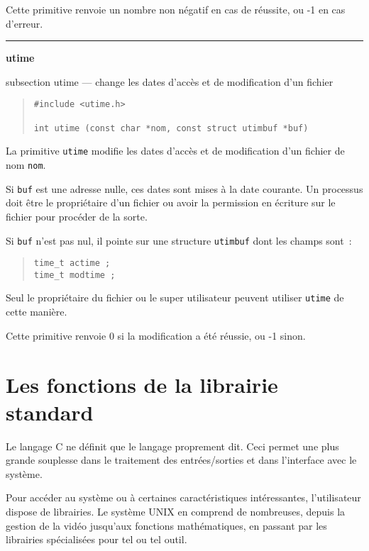 \documentclass [twoside] {report}
\newcommand {\primitive} [1]
    {
	\phantomsection
	{\large \bf #1}
	\addcontentsline {toc} {subsection} {#1}
    }
\newcommand {\separation}
    {
	\vspace {5mm}
	\nopagebreak
	\hrule
    }
\begin{document}
Cette primitive renvoie un nombre non négatif en
cas de réussite, ou -1 en cas d'erreur.




\separation
\primitive {utime} --- change les dates d'accès et de modification d'un fichier

\begin {quote}
\begin {verbatim}
#include <utime.h>

int utime (const char *nom, const struct utimbuf *buf)
\end{verbatim}
\end {quote}

La primitive {\tt utime} modifie les dates d'accès
et de modification d'un fichier de nom {\tt nom}.

Si {\tt buf} est une adresse nulle, ces dates sont
mises à la date courante. Un processus doit être
le propriétaire d'un fichier ou avoir la
permission en écriture sur le fichier pour
procéder de la sorte.

Si {\tt buf} n'est pas nul, il pointe sur une
structure {\tt utimbuf} dont les champs sont~:

\begin {quote}
\begin {verbatim}
time_t actime ;
time_t modtime ;
\end{verbatim}
\end {quote}

Seul le propriétaire du fichier ou le super
utilisateur peuvent utiliser {\tt utime} de cette
manière.

Cette primitive renvoie 0 si la modification a
été réussie, ou -1 sinon.



\cleardoublepage

\chapter {Les fonctions de la librairie standard}


Le langage C ne définit que le langage proprement dit. Ceci
permet une plus grande souplesse dans le traitement des
entrées/sorties et dans l'interface avec le système.

Pour accéder au système ou à certaines caractéristiques
intéressantes, l'utilisateur dispose de librairies. Le
système UNIX en comprend de nombreuses, depuis la gestion de
la vidéo jusqu'aux fonctions mathématiques, en passant par
les librairies spécialisées pour tel ou tel outil.
\end{document}
